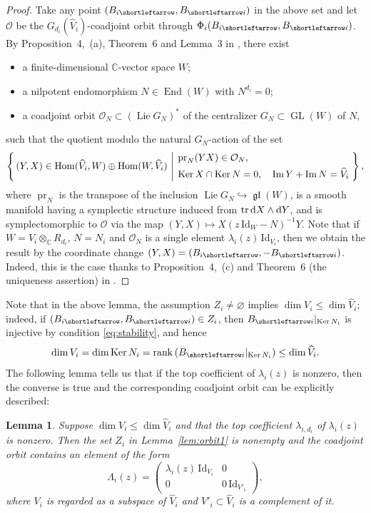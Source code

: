 \documentclass[pdftex]{sigma}
\newcommand{\slar}{\shortleftarrow}
\newenvironment{itm}%
{\begin{itemize}
\setlength{\itemsep}{0em}
}%
{\end{itemize}}
\numberwithin{equation}{section}
\newtheorem{Lemma}[Theorem]{Lemma}
\theoremstyle{definition}
\newcommand{\C}{\mathbb{C}} %
\newcommand{\GL}{\operatorname{GL}} %
\newcommand{\gl}{\operatorname{\mathfrak{gl}}}
\newcommand{\Lie}{\operatorname{Lie}} %
\newcommand{\End}{\operatorname{End}}
\newcommand{\Hom}{\operatorname{Hom}}
\newcommand{\Ker}{\operatorname{Ker}}
\newcommand{\range}{\operatorname{Im}}
\newcommand{\rank}{\operatorname{rank}}
\newcommand{\tr}{\operatorname{tr}}
\newcommand{\unit}{\mathrm{Id}}
\newcommand{\prj}{\operatorname{pr}}
\newcommand{\rset}[2]%
{\left\{ \, #1 \, \left| \hspace{0.25em} #2\right. \, \right\} }
\newcommand{\bO}{\mathcal{O}}
\newcommand{\rd}{\mathop{\mathrm{d}\!}\mathstrut}
\begin{document}
\begin{proof}
Take any point $(B_{i \slar},B_{\slar i})$ in the above set
and let $\bO$ be the $G_{d_i}(\widehat{V}_i)$-coadjoint orbit
through $\Phi_i(B_{i \slar},B_{\slar i})$.
By Proposition~4,~(a), Theorem~6 and Lemma~3 in \cite{0911.3863},
there exist
\begin{itm}
\item a f\/inite-dimensional $\C$-vector space $W$;
\item a nilpotent endomorphism $N \in \End(W)$ with $N^{d_i}=0$;
\item a coadjoint orbit $\bO_N \subset (\Lie G_N)^*$
of the centralizer $G_N \subset \GL(W)$ of $N$,
\end{itm}
such that the quotient modulo the natural $G_N$-action of the set
\[
\rset{(Y,X) \in \Hom(\widehat{V}_i,W)
\oplus \Hom(W,\widehat{V}_i)}{%
\begin{aligned}
&\prj_N(YX) \in \bO_N,\\
&\Ker X \cap \Ker N =0, \quad
\range Y + \range N =\widehat{V}_i
\end{aligned}
},
\]
where $\prj_N$ is the transpose of the inclusion
$\Lie G_N \hookrightarrow \gl(W)$,
is a smooth manifold having a symplectic
structure induced from $\tr \rd X \wedge \rd Y$,
and is symplectomorphic to $\bO$ via the map
$(Y,X) \mapsto X(z\,\unit_{W} -N)^{-1}Y$.
Note that if $W=V_i\otimes_\C R_{d_i}$, $N=N_i$ and
$\bO_N$ is a single element $\lambda_i(z)\,\unit_{V_i}$,
then we obtain the result by the coordinate change
$(Y,X)=(B_{i \slar},-B_{\slar i})$.
Indeed, this is the case thanks to Proposition~4,~(c) and
Theorem~6 (the uniqueness assertion) in \cite{0911.3863}.
\end{proof}

Note that in the above lemma, the assumption $Z_i \neq \varnothing$
implies $\dim V_i \leq \dim \widehat{V}_i$;
indeed, if $(B_{i \slar},B_{\slar i}) \in Z_i$,
then $B_{\slar i}|_{\Ker N_i}$ is injective by condition \eqref{eq:stability},
and hence
\[
\dim V_i = \dim \Ker N_i = \rank \left( B_{\slar i}|_{\Ker N_i} \right)
\leq \dim \widehat{V}_i.
\]
The following lemma tells us that if the top coef\/f\/icient
of $\lambda_i(z)$ is nonzero,
then the converse is true and
the corresponding coadjoint orbit can be explicitly described:
\begin{Lemma}\label{lem:orbit2}
Suppose $\dim V_i \leq \dim \widehat{V}_i$ and that the top coefficient
$\lambda_{i,d_i}$ of $\lambda_i(z)$ is nonzero.
Then the set $Z_i$ in Lemma~{\rm \ref{lem:orbit1}} is nonempty
and the coadjoint orbit
contains an element of the form
\[
\Lambda_i(z)= \begin{pmatrix}
\lambda_i(z)\,\unit_{V_i} & 0 \\
0 & 0\,\unit_{V'_i} \end{pmatrix},
\]
where $V_i$ is regarded as a subspace of $\widehat{V}_i$ and
$V'_i \subset \widehat{V}_i$ is a complement of it.
\end{Lemma}
\end{document}
